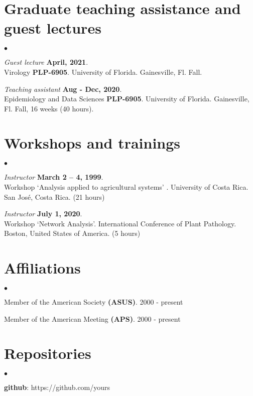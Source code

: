 \documentclass[margin,line]{res}
\newenvironment{list2}{
  \begin{list}{$\bullet$}{%
      \setlength{\itemsep}{0in}
      \setlength{\parsep}{0in} \setlength{\parskip}{0in}
      \setlength{\topsep}{0in} \setlength{\partopsep}{0in} 
      \setlength{\leftmargin}{0.2in}}}{\end{list}}
\begin{document}
\begin{resume}
\section{\sc Graduate teaching assistance and guest lectures}
\begin{list2}
\item[] {\em Guest lecture} \hfill {\bf April, 2021}. \\ 
Virology  {\bf PLP-6905}. University of Florida. Gainesville, Fl. Fall.\\
\item[] {\em Teaching assistant} \hfill {\bf Aug - Dec, 2020}. \\ 
Epidemiology and Data Sciences {\bf PLP-6905}. University of Florida. Gainesville, Fl. Fall, 16 weeks (40 hours).\\
\end{list2}


\section{\sc Workshops and trainings}
\begin{list2}
\item[] {\em Instructor} \hfill {\bf March 2 -- 4, 1999}. \\
Workshop `Analysis applied to agricultural systems' . University of Costa Rica. San Jos\'e, Costa Rica. (21 hours)\\
\item[] {\em Instructor} \hfill {\bf July 1, 2020}. \\
Workshop `Network Analysis'. International Conference of Plant Pathology. Boston, United States of America. (5 hours)\\
\end{list2}

\section{\sc Affiliations}
\begin{list2}
\item[] Member of the American Society {\bf (ASUS)}. 2000 - present\\
\item[] Member of the American Meeting {\bf (APS)}. 2000 - present\\ 
\end{list2}

\section{\sc Repositories} 
\begin{list2}
\item[] {\bf github}: https://github.com/yours
\end{list2}



\end{resume}
\end{document}

